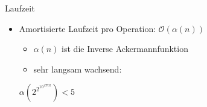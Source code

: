 \begin{frame}{Laufzeit}
	\begin{itemize}
		\item Amortisierte Laufzeit pro Operation: $\mathcal{O}(\alpha(n))$
		\begin{itemize}
			\item $\alpha(n)$ ist die Inverse Ackermannfunktion
			\item sehr langsam wachsend:
		\end{itemize}
		\centerline{$\alpha( 2 ^ {2 ^{10 ^{19792}}}) < 5$}
	\end{itemize}
\end{frame}



